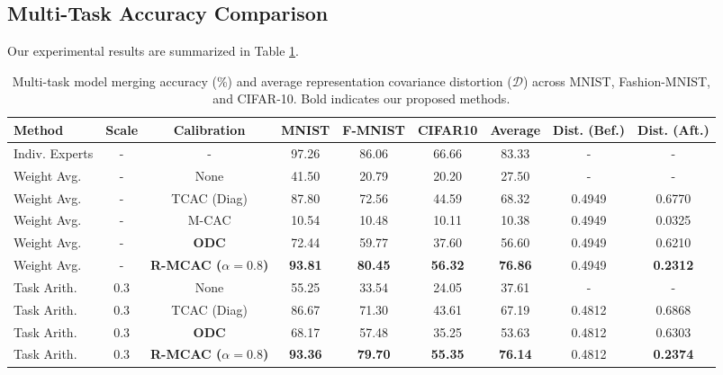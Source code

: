 \documentclass{article}
\theoremstyle{plain}
\theoremstyle{definition}
\theoremstyle{remark}
\begin{document}
\subsection{Multi-Task Accuracy Comparison}
Our experimental results are summarized in Table \ref{tab:main_results}.

\begin{table}[t]
  \caption{Multi-task model merging accuracy (\%) and average representation covariance distortion ($\mathcal{D}$) across MNIST, Fashion-MNIST, and CIFAR-10. Bold indicates our proposed methods.}
  \label{tab:main_results}
  \vskip 0.15in
  \begin{center}
    \begin{small}
      \setlength{\tabcolsep}{3pt}
      \begin{tabular}{lcccccccc}
        \toprule
        Method & Scale & Calibration & MNIST & F-MNIST & CIFAR10 & Average & Dist. (Bef.) & Dist. (Aft.) \\
        \midrule
        Indiv. Experts & - & - & 97.26 & 86.06 & 66.66 & 83.33 & - & - \\
        \midrule
        Weight Avg. & - & None & 41.50 & 20.79 & 20.20 & 27.50 & - & - \\
        Weight Avg. & - & TCAC (Diag) & 87.80 & 72.56 & 44.59 & 68.32 & 0.4949 & 0.6770 \\
        Weight Avg. & - & M-CAC & 10.54 & 10.48 & 10.11 & 10.38 & 0.4949 & 0.0325 \\
        Weight Avg. & - & \textbf{ODC} & 72.44 & 59.77 & 37.60 & 56.60 & 0.4949 & 0.6210 \\
        Weight Avg. & - & \textbf{R-MCAC ($\alpha=0.8$)} & \textbf{93.81} & \textbf{80.45} & \textbf{56.32} & \textbf{76.86} & 0.4949 & \textbf{0.2312} \\
        \midrule
        Task Arith. & 0.3 & None & 55.25 & 33.54 & 24.05 & 37.61 & - & - \\
        Task Arith. & 0.3 & TCAC (Diag) & 86.67 & 71.30 & 43.61 & 67.19 & 0.4812 & 0.6868 \\
        Task Arith. & 0.3 & \textbf{ODC} & 68.17 & 57.48 & 35.25 & 53.63 & 0.4812 & 0.6303 \\
        Task Arith. & 0.3 & \textbf{R-MCAC ($\alpha=0.8$)} & \textbf{93.36} & \textbf{79.70} & \textbf{55.35} & \textbf{76.14} & 0.4812 & \textbf{0.2374} \\
        \bottomrule
      \end{tabular}
    \end{small}
  \end{center}
  \vskip -0.1in
\end{table}
\end{document}

